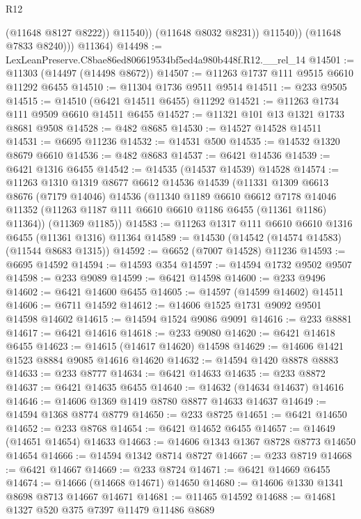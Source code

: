 \begin{lexlean}{R12}
\begin{coremodule}
                      (@11648 @8127 @8222))
                    @11540))
                (@11648 @8032 @8231))
              @11540))
          (@11648 @7833 @8240)))
      @11364)
@14498 := LexLeanPreserve.C8bae86ed806619534bf5ed4a980b448f.R12.__rel_14
@14501 := @11303 (@14497 (@14498 @8672))
@14507 := @11263 @1737 @111 @9515 @6610 @11292 @6455
@14510 := @11304 @1736 @9511 @9514
@14511 := @233 @9505
@14515 := @14510 (@6421 @14511 @6455) @11292
@14521 := @11263 @1734 @111 @9509 @6610 @14511 @6455
@14527 := @11321 @101 @13 @1321 @1733 @8681 @9508
@14528 := @482 @8685
@14530 := @14527 @14528 @14511
@14531 := @6695 @11236
@14532 := @14531 @500
@14535 := @14532 @1320 @8679 @6610
@14536 := @482 @8683
@14537 := @6421 @14536
@14539 := @6421 @1316 @6455
@14542 := @14535 (@14537 @14539) @14528
@14574 := @11263
    @1310
    @1319
    @8677
    @6612
    @14536
    @14539
    (@11331
      @1309
      @6613
      @8676
      (@7179 @14046)
      @14536
      (@11340
        @1189
        @6610
        @6612
        @7178
        @14046
        @11352
        (@11263 @1187 @111 @6610 @6610 @1186 @6455 (@11361 @1186) @11364))
      (@11369 @1185))
@14583 := @11263 @1317 @111 @6610 @6610 @1316 @6455 (@11361 @1316) @11364
@14589 := @14530 (@14542 (@14574 @14583) (@11544 @8683 @1315))
@14592 := @6652 (@7007 @14528) @11236
@14593 := @6695 @14592
@14594 := @14593 @354
@14597 := @14594 @1732 @9502 @9507
@14598 := @233 @9089
@14599 := @6421 @14598
@14600 := @233 @9496
@14602 := @6421 @14600 @6455
@14605 := @14597 (@14599 @14602) @14511
@14606 := @6711 @14592
@14612 := @14606 @1525 @1731 @9092 @9501 @14598 @14602
@14615 := @14594 @1524 @9086 @9091
@14616 := @233 @8881
@14617 := @6421 @14616
@14618 := @233 @9080
@14620 := @6421 @14618 @6455
@14623 := @14615 (@14617 @14620) @14598
@14629 := @14606 @1421 @1523 @8884 @9085 @14616 @14620
@14632 := @14594 @1420 @8878 @8883
@14633 := @233 @8777
@14634 := @6421 @14633
@14635 := @233 @8872
@14637 := @6421 @14635 @6455
@14640 := @14632 (@14634 @14637) @14616
@14646 := @14606 @1369 @1419 @8780 @8877 @14633 @14637
@14649 := @14594 @1368 @8774 @8779
@14650 := @233 @8725
@14651 := @6421 @14650
@14652 := @233 @8768
@14654 := @6421 @14652 @6455
@14657 := @14649 (@14651 @14654) @14633
@14663 := @14606 @1343 @1367 @8728 @8773 @14650 @14654
@14666 := @14594 @1342 @8714 @8727
@14667 := @233 @8719
@14668 := @6421 @14667
@14669 := @233 @8724
@14671 := @6421 @14669 @6455
@14674 := @14666 (@14668 @14671) @14650
@14680 := @14606 @1330 @1341 @8698 @8713 @14667 @14671
@14681 := @11465 @14592
@14688 := @14681 @1327 @520 @375 @7397 @11479 @11486 @8689

\end{coremodule}
\end{lexlean}
